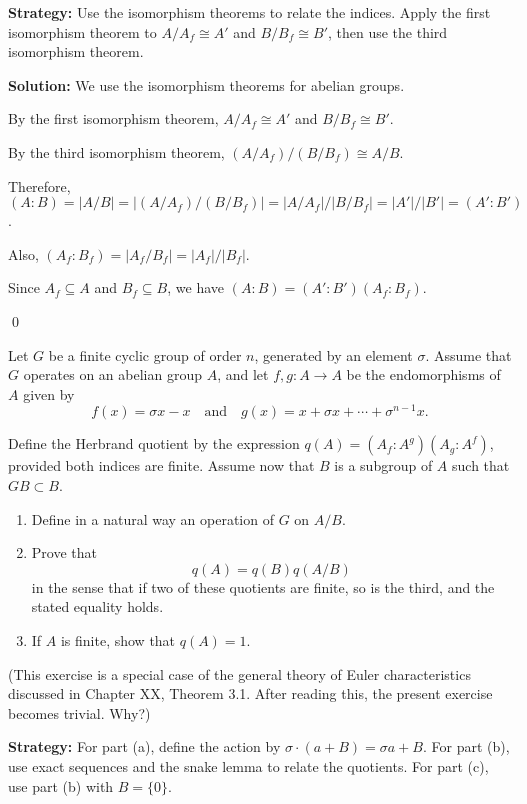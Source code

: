 \noindent\textbf{Strategy:} Use the isomorphism theorems to relate the indices. Apply the first isomorphism theorem to $A/A_f \cong A'$ and $B/B_f \cong B'$, then use the third isomorphism theorem.

\noindent\textbf{Solution:} We use the isomorphism theorems for abelian groups.

By the first isomorphism theorem, $A/A_f \cong A'$ and $B/B_f \cong B'$.

By the third isomorphism theorem, $(A/A_f)/(B/B_f) \cong A/B$.

Therefore, $(A : B) = |A/B| = |(A/A_f)/(B/B_f)| = |A/A_f|/|B/B_f| = |A'|/|B'| = (A' : B')$.

Also, $(A_f : B_f) = |A_f/B_f| = |A_f|/|B_f|$.

Since $A_f \subseteq A$ and $B_f \subseteq B$, we have $(A : B) = (A' : B')(A_f : B_f)$.


\qed
\begin{problembox}
Let $G$ be a finite cyclic group of order $n$, generated by an element $\sigma$. Assume that $G$ operates on an abelian group $A$, and let $f, g : A \to A$ be the endomorphisms of $A$ given by
\[f(x) = \sigma x - x \quad \text{and} \quad g(x) = x + \sigma x + \cdots + \sigma^{n-1}x.\]

Define the Herbrand quotient by the expression $q(A) = (A_f : A^g)(A_g : A^f)$, provided both indices are finite. Assume now that $B$ is a subgroup of $A$ such that $GB \subset B$.
\begin{enumerate}[label=(\alph*)]
\item Define in a natural way an operation of $G$ on $A/B$.
\item Prove that
\[q(A) = q(B)q(A/B)\]
in the sense that if two of these quotients are finite, so is the third, and the stated equality holds.
\item If $A$ is finite, show that $q(A) = 1$.
\end{enumerate}
(This exercise is a special case of the general theory of Euler characteristics discussed in Chapter XX, Theorem 3.1. After reading this, the present exercise becomes trivial. Why?)
\end{problembox}

\noindent\textbf{Strategy:} For part (a), define the action by $\sigma \cdot (a + B) = \sigma a + B$. For part (b), use exact sequences and the snake lemma to relate the quotients. For part (c), use part (b) with $B = \{0\}$.

